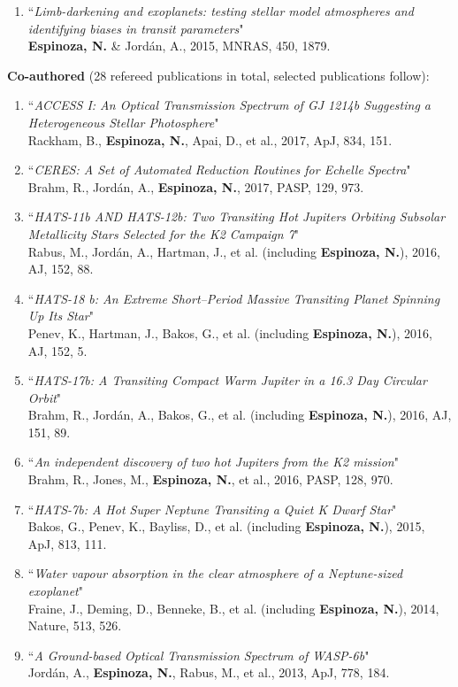 \documentclass[11pt, a4paper]{article} %
\begin{document}
\begin{flushleft}
\begin{enumerate}
\item ``\textit{Limb-darkening and exoplanets: testing stellar model atmospheres and identifying biases in transit parameters}"\\
         \textbf{Espinoza, N.} \& Jord\'an, A., 2015, MNRAS, 450, 1879. 
\end{enumerate}
\textbf{Co-authored} (28 refereed publications in total, selected publications follow):
\begin{enumerate}
\setlength\itemsep{0.05cm}
\item ``\textit{ACCESS I: An Optical Transmission Spectrum of GJ 1214b Suggesting a Heterogeneous Stellar Photosphere}"\\
          Rackham, B., \textbf{Espinoza, N.}, Apai, D., et al., 2017, ApJ, 834, 151.
\item ``\textit{CERES: A Set of Automated Reduction Routines for Echelle Spectra}"\\
          Brahm, R., Jord\'an, A., \textbf{Espinoza, N.}, 2017, PASP, 129, 973.
\item ``\textit{HATS-11b AND HATS-12b: Two Transiting Hot Jupiters Orbiting Subsolar Metallicity Stars Selected for the K2 Campaign 7}"\\
          Rabus, M., Jord\'an, A., Hartman, J., et al. (including \textbf{Espinoza, N.}), 2016, AJ, 152, 88.
\item ``\textit{HATS-18 b: An Extreme Short--Period Massive Transiting Planet Spinning Up Its Star}"\\
          Penev, K., Hartman, J., Bakos, G., et al. (including \textbf{Espinoza, N.}), 2016, AJ, 152, 5.
\item ``\textit{HATS-17b: A Transiting Compact Warm Jupiter in a 16.3 Day Circular Orbit}"\\
          Brahm, R., Jord\'an, A., Bakos, G., et al. (including \textbf{Espinoza, N.}), 2016, AJ, 151, 89.
\item ``\textit{An independent discovery of two hot Jupiters from the K2 mission}"\\
          Brahm, R., Jones, M., \textbf{Espinoza, N.}, et al., 2016, PASP, 128, 970.
\item ``\textit{HATS-7b: A Hot Super Neptune Transiting a Quiet K Dwarf Star}"\\
          Bakos, G., Penev, K., Bayliss, D., et al. (including \textbf{Espinoza, N.}), 2015, ApJ, 813, 111.
\item ``\textit{Water vapour absorption in the clear atmosphere of a Neptune-sized exoplanet}"\\
          Fraine, J., Deming, D., Benneke, B., et al. (including \textbf{Espinoza, N.}), 2014, Nature, 513, 526.
\item ``\textit{A Ground-based Optical Transmission Spectrum of WASP-6b}"\\
          Jord\'an, A., \textbf{Espinoza, N.}, Rabus, M., et al., 2013, ApJ, 778, 184.
\end{enumerate}
\end{flushleft}
\end{document}
